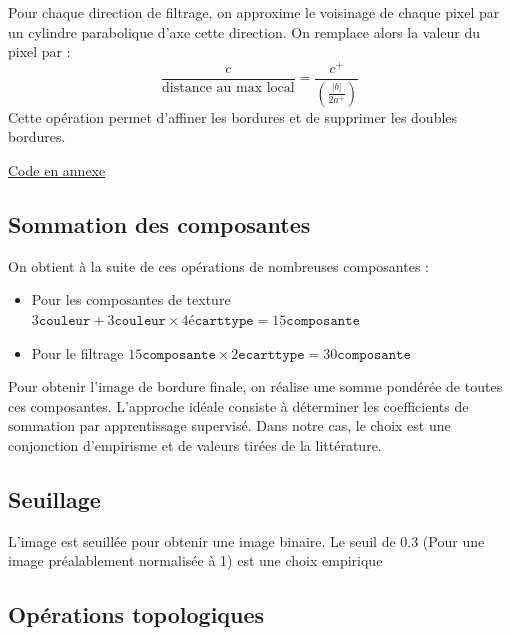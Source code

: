 \documentclass{article}
\begin{document}
\begin{multicols}{2}
Pour chaque direction de filtrage, on approxime le voisinage de chaque pixel par un cylindre parabolique d'axe cette direction. On remplace alors la valeur du pixel par :
$$\frac{c}{\text{distance au max local}} = \frac{c^+}{\left(\frac{|b|}{2a^+}\right)}$$
Cette opération permet d'affiner les bordures et de supprimer les doubles bordures.

\hyperref[parab]{Code en annexe}

\subsection{Sommation des composantes}

On obtient à la suite de ces opérations de nombreuses composantes :
\begin{itemize}
	\item Pour les composantes de texture $3\mathtt{couleur} + 3\mathtt{couleur} \times 4\mathtt{écarttype} = 15\mathtt{composante}$
	\item Pour le filtrage $15\mathtt{composante} \times 2\mathtt{ecarttype} = 30\mathtt{composante}$
\end{itemize}
Pour obtenir l'image de bordure finale, on réalise une somme pondérée de toutes ces composantes. L'approche idéale consiste à déterminer les coefficients de sommation  par apprentissage supervisé. Dans notre cas, le choix est une conjonction d'empirisme et de valeurs tirées de la littérature.

\subsection{Seuillage}

L'image est seuillée pour obtenir une image binaire. Le seuil de 0.3 (Pour une image préalablement normalisée à 1) est une choix empirique

\subsection{Opérations topologiques}


\end{multicols}
\end{document}
